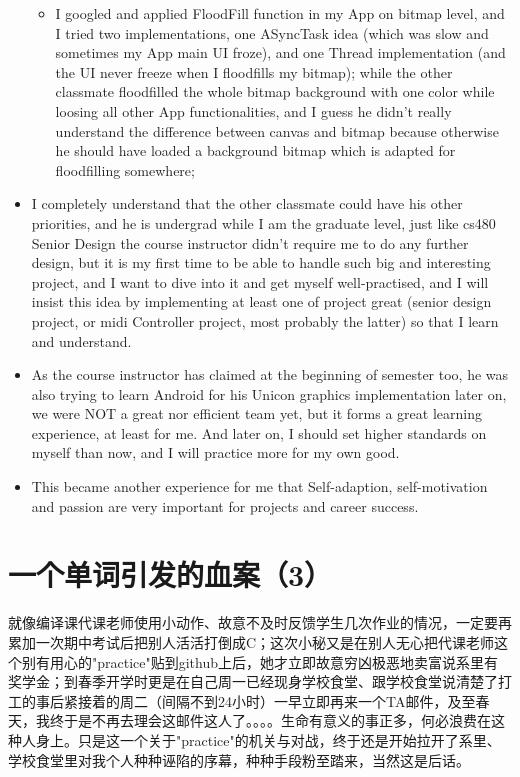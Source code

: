 \documentclass[12pt]{book}
\begin{document}
\begin{itemize}
\begin{itemize}
\item I googled and applied FloodFill function in my App on bitmap level, and I tried two implementations, one ASyncTask idea (which was slow and sometimes my App main UI froze), and one Thread implementation (and the UI never freeze when I floodfills my bitmap); while the other classmate floodfilled the whole bitmap background with one color while loosing all other App functionalities, and I guess he didn’t really understand the difference between canvas and bitmap because otherwise he should have loaded a background bitmap which is adapted for floodfilling somewhere;
\end{itemize}
\item I completely understand that the other classmate could have his other priorities, and he is undergrad while I am the graduate level, just like cs480 Senior Design the course instructor didn’t require me to do any further design, but it is my first time to be able to handle such big and interesting project, and I want to dive into it and get myself well-practised, and I will insist this idea by implementing at least one of project great (senior design project, or midi Controller project, most probably the latter) so that I learn and understand.
\item As the course instructor has claimed at the beginning of semester too, he was also trying to learn Android for his Unicon graphics implementation later on, we were NOT a great nor efficient team yet, but it forms a great learning experience, at least for me. And later on, I should set higher standards on myself than now, and I will practice more for my own good.
\item This became another experience for me that Self-adaption, self-motivation and passion are very important for projects and career success.
\end{itemize}

\section{一个单词引发的血案（3）}
\label{sec-36-3}
就像编译课代课老师使用小动作、故意不及时反馈学生几次作业的情况，一定要再累加一次期中考试后把别人活活打倒成C；这次小秘又是在别人无心把代课老师这个别有用心的"practice"贴到github上后，她才立即故意穷凶极恶地卖富说系里有奖学金；到春季开学时更是在自己周一已经现身学校食堂、跟学校食堂说清楚了打工的事后紧接着的周二（间隔不到24小时）一早立即再来一个TA邮件，及至春天，我终于是不再去理会这邮件这人了。。。。生命有意义的事正多，何必浪费在这种人身上。只是这一个关于"practice"的机关与对战，终于还是开始拉开了系里、学校食堂里对我个人种种诬陷的序幕，种种手段粉至踏来，当然这是后话。
\end{document}

